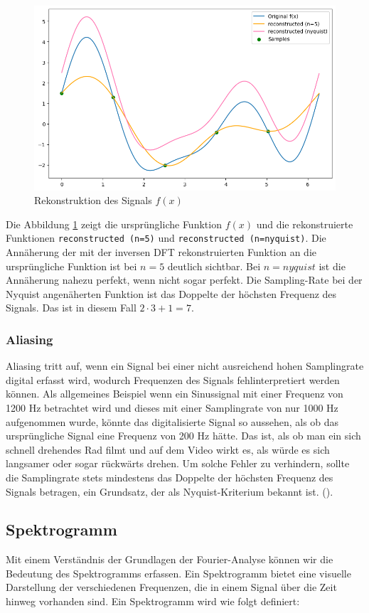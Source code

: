 \documentclass[11pt,a4paper]{article}
\begin{document}
\begin{figure}[h]
	\centering
	\includegraphics[width=0.60\linewidth]{img/dft_reconstructed.png}
	\caption{Rekonstruktion des Signals \(f(x)\)}
	\label{fig:dft_example_reconstructed}
\end{figure}

\noindent
\newline
Die Abbildung \ref{fig:dft_example_reconstructed} zeigt die ursprüngliche Funktion \(f(x)\) und die
rekonstruierte Funktionen \texttt{reconstructed (n=5)} und \texttt{reconstructed (n=nyquist)}.
Die Annäherung der mit der inversen DFT rekonstruierten Funktion an die ursprüngliche Funktion ist
bei \(n=5\) deutlich sichtbar. Bei \(n=nyquist\) ist die Annäherung nahezu perfekt, wenn nicht sogar
perfekt. Die Sampling-Rate bei der Nyquist angenäherten Funktion ist das Doppelte der höchsten
Frequenz des Signals. Das ist in diesem Fall \(2 \cdot 3 + 1 = 7\).

\subsubsection{Aliasing}
Aliasing tritt auf, wenn ein Signal bei einer nicht ausreichend hohen Samplingrate digital erfasst
wird, wodurch Frequenzen des Signals fehlinterpretiert werden können. Als allgemeines Beispiel wenn
ein Sinussignal mit einer Frequenz von 1200 Hz betrachtet wird und dieses mit einer Samplingrate
von nur 1000 Hz aufgenommen wurde, könnte das digitalisierte Signal so aussehen, als ob das
ursprüngliche Signal eine Frequenz von 200 Hz hätte. Das ist, als ob man ein sich schnell
drehendes Rad filmt und auf dem Video wirkt es, als würde es sich langsamer oder sogar rückwärts
drehen. Um solche Fehler zu verhindern, sollte die Samplingrate stets mindestens das
Doppelte der höchsten Frequenz des Signals betragen, ein Grundsatz, der als Nyquist-Kriterium
bekannt ist. (\cite[]{weitz2023fourier}).

\subsection{Spektrogramm}
Mit einem Verständnis der Grundlagen der Fourier-Analyse können wir die Bedeutung des Spektrogramms
erfassen. Ein Spektrogramm bietet eine visuelle Darstellung der verschiedenen Frequenzen, die in
einem Signal über die Zeit hinweg vorhanden sind. Ein Spektrogramm wird wie folgt definiert:
\end{document}
